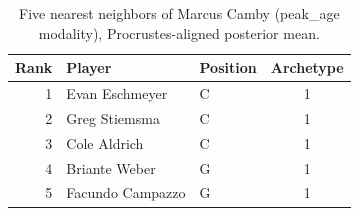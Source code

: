 \begin{table}[htbp]
  \centering\small
  \begin{tabular}{rllc}
    \toprule
    Rank & Player & Position & Archetype \\
    \midrule
    1 & Evan Eschmeyer & C & 1 \\
    2 & Greg Stiemsma & C & 1 \\
    3 & Cole Aldrich & C & 1 \\
    4 & Briante Weber & G & 1 \\
    5 & Facundo Campazzo & G & 1 \\
    \bottomrule
  \end{tabular}
  \caption{Five nearest neighbors of Marcus Camby (peak_age modality), Procrustes-aligned posterior mean.}
  \label{tab:Marcus_Camby_neighbors_peak_age}
\end{table}

